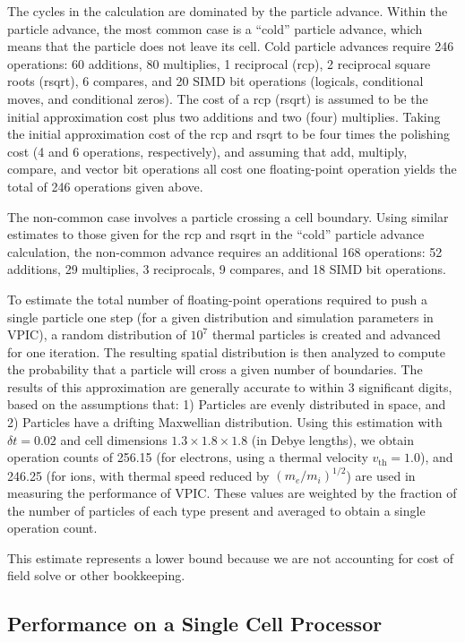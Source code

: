 \documentclass[letter,10pt]{article}
\begin{document}
The cycles in the calculation are dominated by the particle advance.
Within the particle advance, the most common case is a ``cold'' particle
advance, which means that the particle does not leave its cell.  Cold
particle advances require 246 operations:  60 additions, 80 multiplies, 1 
reciprocal (rcp),
2 reciprocal square roots (rsqrt), 6 compares, and 20 SIMD bit operations (logicals,
conditional moves, and conditional zeros).  The cost of a rcp 
(rsqrt) is assumed to be the initial approximation cost plus two additions and 
two (four) 
multiplies.  Taking the initial approximation cost of the rcp
and rsqrt to be four times the polishing cost (4 and 6 operations, respectively), and assuming that add, 
multiply, compare, and vector bit operations all cost one floating-point operation yields the total of 246 operations given above.

The non-common case involves a particle crossing a cell boundary.
Using similar estimates to those given for the rcp and rsqrt in the
``cold'' particle advance calculation, the non-common advance requires
an additional 168 operations: 52 additions, 29 multiplies, 3 reciprocals, 9 compares,
and 18 SIMD bit operations.

To estimate the total number of floating-point operations required to
push a single particle one step (for a given distribution and simulation
parameters in VPIC), a random distribution of $10^7$ thermal particles 
is created
and advanced for one iteration.  The resulting spatial distribution
is then analyzed to compute the probability that a particle will
cross a given number of boundaries.  The results of this approximation
are generally accurate to within 3 significant digits,
based on the assumptions that: 1) Particles are evenly distributed
in space, and 2) Particles have a drifting Maxwellian distribution.
Using this estimation with $\delta t = 0.02$ and cell
dimensions $1.3  \times 1.8 \times 1.8$ (in Debye lengths),
we obtain operation counts of 256.15 (for electrons,
using a thermal velocity $v_{\mathrm{th}} = 1.0$), and 246.25
(for ions, with thermal speed reduced by $(m_e/m_i)^{1/2}$)
are used in measuring the performance of VPIC.
These values are weighted by the fraction of the number of particles
of each type present
and averaged to obtain a single operation count.

This estimate represents a lower bound because we are not accounting
for cost of field solve or other bookkeeping. 

\subsection{Performance on a Single Cell Processor}
\end{document}
